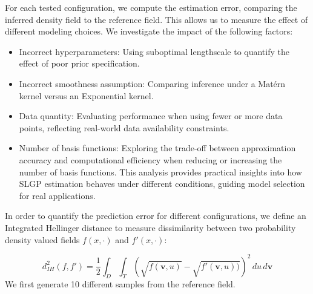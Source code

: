 \documentclass[
]{article}
\providecommand{\tightlist}{%
  \setlength{\itemsep}{0pt}\setlength{\parskip}{0pt}}
\begin{document}
For each tested configuration, we compute the estimation error, comparing the inferred density field to the reference field. This allows us to measure the effect of different modeling choices. We investigate the impact of the following factors:

\begin{itemize}
\tightlist
\item
  Incorrect hyperparameters: Using suboptimal lengthscale to quantify the effect of poor prior specification.
\item
  Incorrect smoothness assumption: Comparing inference under a Matérn kernel versus an Exponential kernel.
\item
  Data quantity: Evaluating performance when using fewer or more data points, reflecting real-world data availability constraints.
\item
  Number of basis functions: Exploring the trade-off between approximation accuracy and computational efficiency when reducing or increasing the number of basis functions.
  This analysis provides practical insights into how SLGP estimation behaves under different conditions, guiding model selection for real applications.
\end{itemize}

In order to quantify the prediction error for different configurations, we define an Integrated Hellinger distance to measure dissimilarity between two probability density valued fields \(f(x, \cdot)\) and \(f'(x, \cdot)\):

\[
d_{IH}^2(f , f' ) = \frac{1}{2}\int_D \int_T \left( \sqrt{f(\mathbf{v}, u)} - \sqrt{f'(\mathbf{v}, u))}  \right)^2 \,du \,d\mathbf{v}
\]
We first generate 10 different samples from the reference field.
\end{document}
